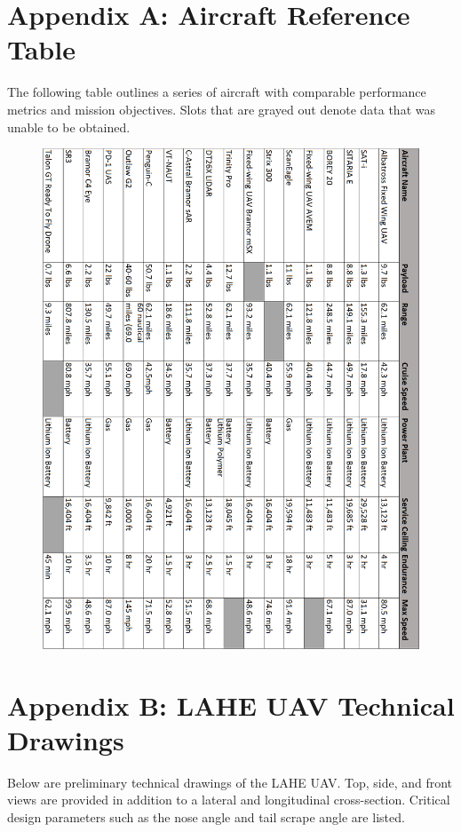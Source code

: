 \documentclass[12pt]{article}
\begin{document}
	\section{Appendix A: Aircraft Reference Table}
	The following table outlines a series of aircraft with comparable performance metrics and mission objectives. Slots that are grayed out denote data that was unable to be obtained.
	\begin{figure}[h!]
		\centering
		\includegraphics{Media/Table.png} %
	\end{figure}
	
	\newpage
	
	\section{Appendix B: LAHE UAV Technical Drawings}
	Below are preliminary technical drawings of the LAHE UAV. Top, side, and front views are provided in addition to a lateral and longitudinal cross-section. Critical design parameters such as the nose angle and tail scrape angle are listed.
\end{document}
